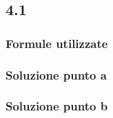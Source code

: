 \documentclass[../../main.tex]{subfiles}
\begin{document}
\subsection*{4.1}
\subsubsection*{Formule utilizzate}
\subsubsection*{Soluzione punto a}
\subsubsection*{Soluzione punto b}
\newpage
\end{document}
